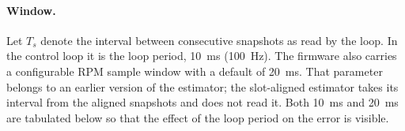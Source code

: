 
\paragraph{Window.}
Let $T_s$ denote the interval between consecutive snapshots as read by the loop. In the control loop it is the loop period, 10~ms (100~Hz). The firmware also carries a configurable RPM sample window with a default of 20~ms. That parameter belongs to an earlier version of the estimator; the slot-aligned estimator takes its interval from the aligned snapshots and does not read it. Both 10~ms and 20~ms are tabulated below so that the effect of the loop period on the error is visible.


